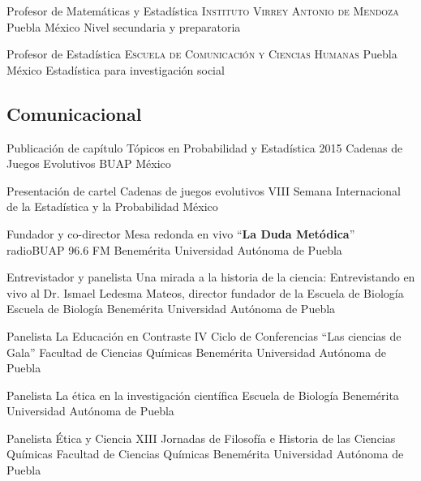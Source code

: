 \documentclass[11pt, letterpaper, roman]{moderncv}
\begin{document}
		{Profesor de Matemáticas y Estadística}
		{\newline \textsc{Instituto Virrey Antonio de Mendoza}}
		{Puebla}
		{México}
		{Nivel secundaria y preparatoria}

		{Profesor de Estadística}
		{\newline \textsc{Escuela de Comunicación y Ciencias Humanas}}
		{Puebla}
		{México}
		{Estadística para investigación social}

\subsection{Comunicacional}

        {Publicación de capítulo}
        {Tópicos en Probabilidad y Estadística 2015}
        {Cadenas de Juegos Evolutivos}
        {BUAP}
        {México}

		{Presentación de cartel}
		{Cadenas de juegos evolutivos}
		{VIII Semana Internacional de la Estadística y la Probabilidad}
		{}
		{México}

		{Fundador y co-director}
		{Mesa redonda en vivo ``\textbf{La Duda Metódica}''}
		{}
		{\newline radioBUAP 96.6 FM}
		{Benemérita Universidad Autónoma de Puebla}

		{Entrevistador y panelista}
		{Una mirada a la historia de la ciencia: Entrevistando en vivo al Dr. 
		Ismael Ledesma Mateos, director fundador de la Escuela de Biología}
		{}
		{\newline Escuela de Biología}
		{Benemérita Universidad Autónoma de Puebla}

		{Panelista}
		{La Educación en Contraste}
		{IV Ciclo de Conferencias ``Las ciencias de Gala''}
		{\newline Facultad de Ciencias Químicas}
		{Benemérita Universidad Autónoma de Puebla}

		{Panelista}
		{La ética en la investigación científica}
		{}
		{\newline Escuela de Biología}
		{Benemérita Universidad Autónoma de Puebla}

		{Panelista}
		{Ética y Ciencia}
		{XIII Jornadas de Filosofía e Historia de las Ciencias Químicas}
		{\newline Facultad de Ciencias Químicas}
		{Benemérita Universidad Autónoma de Puebla}
\end{document}
